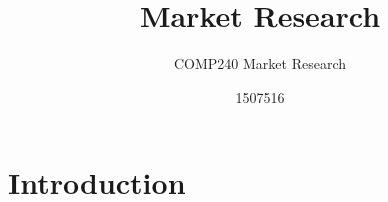 \documentclass{scrartcl}
\title{Market Research}
\subtitle{COMP240 Market Research}
\author{1507516}
\begin{document}
\maketitle

\section{Introduction}
\end{document}
